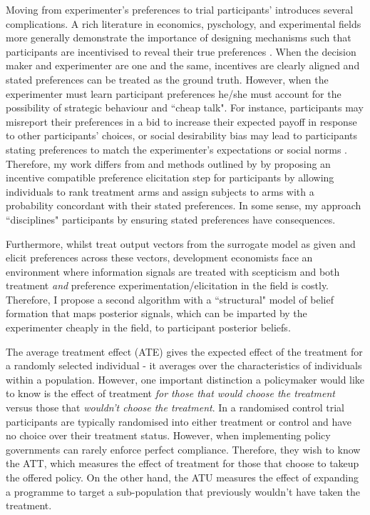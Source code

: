 \documentclass[twoside,11pt]{article}
\begin{document}
Moving from experimenter's preferences to trial participants' introduces several 
complications. A rich literature in economics, pyschology, and experimental fields 
more generally demonstrate 
the importance of designing mechanisms such that participants are incentivised 
to reveal their true preferences \citep{Savage1971,ar-delavande}. When the decision maker and experimenter are 
one and the same, 
incentives are clearly aligned and stated preferences can be treated as the ground 
truth. However, when the experimenter must learn participant 
preferences he/she must account for the possibility of strategic behaviour and 
``cheap talk". For instance, participants may misreport their preferences in a bid
to increase their expected payoff in response to other participants' choices, or 
social desirability bias may lead to participants stating preferences to match 
the experimenter's expectations or social norms \citep{brownback2018a}. Therefore, my work 
differs from \cite{lin2022preference} and methods outlined by \citep{furnkranz2010a} by proposing 
an incentive compatible 
preference elicitation step for participants by allowing individuals
to rank treatment arms and assign subjects to arms with a probability
concordant with their stated preferences. In some sense, my approach ``disciplines"
participants by ensuring stated preferences have consequences.


Furthermore, whilst \cite{lin2022preference} treat output vectors from the surrogate 
model as given and elicit preferences across these vectors, development economists 
face an environment where information signals are treated with 
scepticism and both treatment \textit{and} preference experimentation/elicitation
 in the field is costly. Therefore, I propose a second algorithm with a ``structural" 
 model of belief formation that maps posterior signals, which can be imparted by 
 the experimenter cheaply in the field, to participant posterior beliefs.


The average treatment effect (ATE) gives the expected effect of the treatment for 
a randomly selected individual - it averages over the characteristics of 
individuals within a population. However, one important distinction a policymaker 
would like to know is the effect of treatment \textit{for those that would choose 
the treatment} versus those that \textit{wouldn't choose the treatment}. In a 
randomised control trial participants are typically randomised into either treatment 
or control and have no choice over their treatment status. However, when implementing 
policy governments can rarely enforce perfect compliance. Therefore, they wish to 
know the ATT, which measures the effect of treatment for those that choose to takeup 
the offered policy. On the other hand, the ATU measures the effect of expanding a 
programme to target a sub-population that previously wouldn't have taken the 
treatment. 
\end{document}
